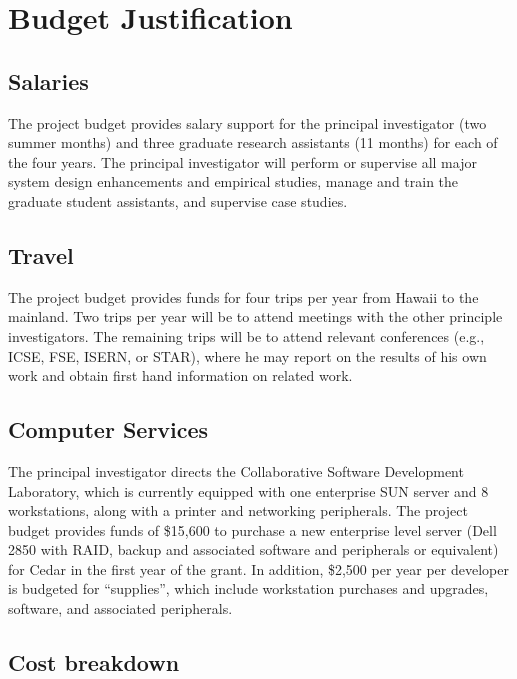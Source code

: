 \documentclass[11pt]{article}
\begin{document}
\pagestyle{empty}
\section*{Budget Justification}

\subsection*{Salaries}

The project budget provides salary support for the principal investigator
(two summer months) and three graduate research
assistants (11 months) for each of the four years.  The principal
investigator will perform or supervise all major system design enhancements
and empirical studies, manage and train the graduate student
assistants, and supervise case studies. 

\subsection*{Travel}

The project budget provides funds for four trips per year from Hawaii to the
mainland.  Two trips per year will be to attend meetings with the other 
principle investigators.  The remaining trips will be to attend
relevant conferences (e.g., ICSE, FSE, ISERN, or STAR), where
he may report on the results of his own work and obtain first hand
information on related work. 

\subsection*{Computer Services}

The principal investigator directs the Collaborative Software Development
Laboratory, which is currently equipped with one enterprise SUN server and
8 workstations, along with a printer and networking
peripherals.  The project budget provides funds of \$15,600 to purchase a
new enterprise level server (Dell 2850 with RAID, backup and associated
software and peripherals or equivalent) for Cedar in the first year of the
grant.  In addition, \$2,500 per year per developer is budgeted for
``supplies'', which include workstation purchases and upgrades, software,
and associated peripherals.


\subsection*{Cost breakdown}
\label{cost-breakdown}
\end{document}
